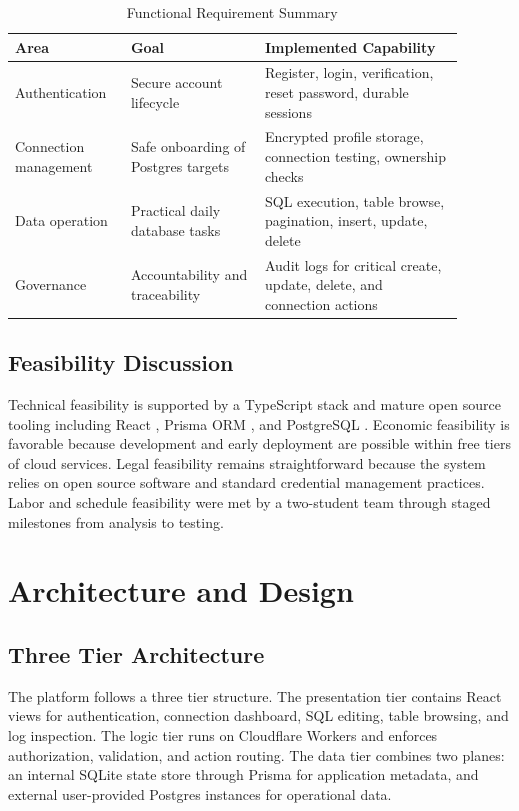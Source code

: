 \documentclass[conference]{IEEEtran}
\begin{document}
\begin{table}[!htbp]
\centering
\caption{Functional Requirement Summary}
\label{tab:req-summary}
\begin{tabular}{|>{\raggedright\arraybackslash}p{0.22\linewidth}|>{\raggedright\arraybackslash}p{0.27\linewidth}|>{\raggedright\arraybackslash}p{0.4\linewidth}|}
\hline
\textbf{Area} & \textbf{Goal} & \textbf{Implemented Capability} \\ \hline
Authentication & Secure account lifecycle & Register, login, verification, reset password, durable sessions \\ \hline
Connection management & Safe onboarding of Postgres targets & Encrypted profile storage, connection testing, ownership checks \\ \hline
Data operation & Practical daily database tasks & SQL execution, table browse, pagination, insert, update, delete \\ \hline
Governance & Accountability and traceability & Audit logs for critical create, update, delete, and connection actions \\ \hline
\end{tabular}
\end{table}

\subsection{Feasibility Discussion}

Technical feasibility is supported by a TypeScript stack and mature open source tooling including React \cite{react}, Prisma ORM \cite{prisma-orm}, and PostgreSQL \cite{postgresql}. Economic feasibility is favorable because development and early deployment are possible within free tiers of cloud services. Legal feasibility remains straightforward because the system relies on open source software and standard credential management practices. Labor and schedule feasibility were met by a two-student team through staged milestones from analysis to testing.

\section{Architecture and Design}

\subsection{Three Tier Architecture}

The platform follows a three tier structure. The presentation tier contains React views for authentication, connection dashboard, SQL editing, table browsing, and log inspection. The logic tier runs on Cloudflare Workers and enforces authorization, validation, and action routing. The data tier combines two planes: an internal SQLite state store through Prisma for application metadata, and external user-provided Postgres instances for operational data.
\end{document}
